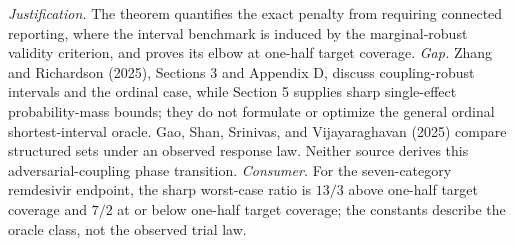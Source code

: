 \documentclass{article}
\begin{document}
\par\smallskip\noindent \textit{Justification.} The theorem quantifies the exact penalty from requiring connected reporting, where the interval benchmark is induced by the marginal-robust validity criterion, and proves its elbow at one-half target coverage. \textit{Gap.} Zhang and Richardson (2025), Sections 3 and Appendix D, discuss coupling-robust intervals and the ordinal case, while Section 5 supplies sharp single-effect probability-mass bounds; they do not formulate or optimize the general ordinal shortest-interval oracle. Gao, Shan, Srinivas, and Vijayaraghavan (2025) compare structured sets under an observed response law. Neither source derives this adversarial-coupling phase transition. \textit{Consumer.} For the seven-category remdesivir endpoint, the sharp worst-case ratio is \(13/3\) above one-half target coverage and \(7/2\) at or below one-half target coverage; the constants describe the oracle class, not the observed trial law.
\end{document}
